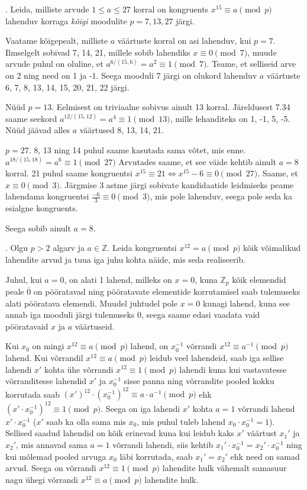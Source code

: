 \documentclass[a4paper, 10pt]{article}
\newcommand{\Z}{\mathbb{Z}}
\newcommand{\w}{\overline}
\begin{document}
. Leida, milliste arvude $1\leq a\leq 27$ korral on kongruents $x^{15}\equiv a\pmod{p}$ lahenduv korraga \emph{kõigi} moodulite $p=7,13,27$ järgi.

\bigskip
Vaatame kõigepealt, milliste $a$ väärtuste korral on asi lahenduv, kui $p=7$. Ilmselgelt sobivad 7, 14, 21, millele sobib lahendiks $x\equiv0\pmod{7}$, muude arvude puhul on oluline, et $a^{6/(15,6)}=a^2\equiv1\pmod{7}$. Teame, et selliseid arve on 2 ning need on 1 ja -1. Seega mooduli 7 järgi on olukord lahenduv $a$ väärtuste 6, 7, 8, 13, 14, 15, 20, 21, 22 järgi. 

Nüüd $p=13$. Eelmisest on triviaalne sobivus ainult 13 korral. Järeldusest 7.34 saame seekord $a^{12/(15,12)}=a^4\equiv1\pmod{13}$, mille lehanditeks on 1, -1, 5, -5. Nüüd jäävad alles $a$ väärtused 8, 13, 14, 21.

$p=27$. 8, 13 ning 14 puhul saame kasutada sama võtet, mis enne. $a^{18/(15,18)}=a^6\equiv{1}\pmod{27}$ Arvutades saame, et see väide kehtib ainult $a=8$ korral. 21 puhul saame kongruentsi $x^{15}\equiv21\Leftrightarrow x^{15}-6\equiv0\pmod{27}$. Saame, et $x\equiv 0 \pmod{3}$. Järgmise 3 astme järgi sobivate kandidaatide leidmiseks peame lahendama kongruentsi $\frac{-6}{3}\equiv0\pmod{3}$, mis pole lahenduv, seega pole seda ka esialgne kongruents. 

Seega sobib ainult $a=8$.
\bigskip

. Olgu $p>2$ algarv ja $a\in\Z$. Leida kongruentsi $x^{12}=a \pmod{p}$ kõik võimalikud lahendite arvud ja tuua iga juhu kohta näide, mis seda realiseerib. 

\bigskip
Juhul, kui $a=0$, on alati 1 lahend, milleks on $x=0$, kuna $\Z_p$ kõik elemendid peale $\w0$ on pööratavad ning pööratavate elementide korrutamisel saab tulemuseks alati pööratava elemendi. Muudel juhtudel pole $x=0$ kunagi lahend, kuna see annab iga mooduli järgi tulemuseks 0, seega saame edasi vaadata vaid pööratavaid $x$ ja $a$ väärtuseid.

Kui $x_0$ on mingi $x^{12}\equiv a\pmod p$ lahend, on $x_0^{-1}$ võrrandi $x^{12}\equiv a^{-1}\pmod p$ lahend. Kui võrrandil $x^{12}\equiv a\pmod p$ leidub veel lahendeid, saab iga sellise lahendi $x'$ kohta ühe võrrandi $x^{12}\equiv1\pmod p$ lahendi kuna kui vastavatesse võrranditesse lahendid $x'$ ja $x_0^{-1}$ sisse panna ning võrrandite pooled kokku korrutada saab $(x')^{12}\cdot{(x_0^{-1})^{12}}\equiv a\cdot a^{-1}\pmod p$ ehk $(x'\cdot x_0^{-1})^{12}\equiv1\pmod p$. Seega on iga lahendi $x'$ kohta $a=1$ võrrandi lahend $x'\cdot x_0^{-1}$ ($x'$ saab ka olla sama mis $x_0$, mis puhul tuleb lahend $x_0\cdot x_0^{-1}=1$). Sellised saadud lahendid on kõik erinevad kuna kui leidub kaks $x'$ väärtust $x_1'$ ja $x_2'$, mis annavad sama $a=1$ võrrandi lahendi, siis kehtib $x_1'\cdot x_0^{-1}=x_2'\cdot x_0^{-1}$ ning kui mõlemad pooled arvuga $x_0$ läbi korrutada, saab $x_1'=x_2'$ ehk need on samad arvud. Seega on võrrandi $x^{12}\equiv1\pmod p$ lahendite hulk vähemalt samasuur nagu ühegi võrrandi $x^{12}\equiv a\pmod p$ lahendite hulk.
\end{document}
